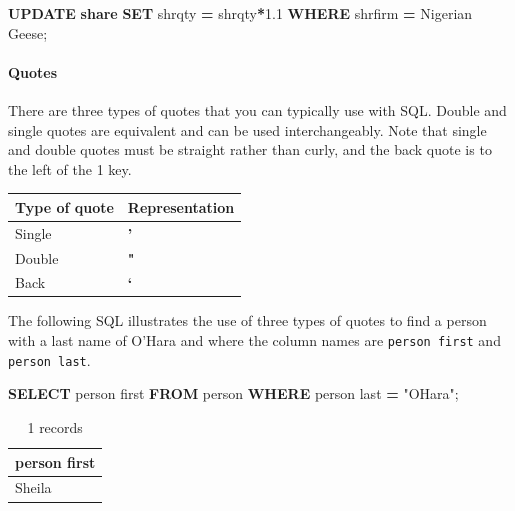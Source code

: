 \documentclass[
]{article}
\newenvironment{Shaded}{\begin{snugshade}}{\end{snugshade}}
\newcommand{\FloatTok}[1]{\textcolor[rgb]{0.00,0.00,0.81}{#1}}
\newcommand{\KeywordTok}[1]{\textcolor[rgb]{0.13,0.29,0.53}{\textbf{#1}}}
\newcommand{\NormalTok}[1]{#1}
\newcommand{\OperatorTok}[1]{\textcolor[rgb]{0.81,0.36,0.00}{\textbf{#1}}}
\newcommand{\OtherTok}[1]{\textcolor[rgb]{0.56,0.35,0.01}{#1}}
\newcommand{\StringTok}[1]{\textcolor[rgb]{0.31,0.60,0.02}{#1}}
\begin{document}
\begin{Shaded}
\begin{Highlighting}[]
\KeywordTok{UPDATE} \KeywordTok{share} \KeywordTok{SET}\NormalTok{ shrqty }\OperatorTok{=}\NormalTok{ shrqty}\OperatorTok{*}\FloatTok{1.1} \KeywordTok{WHERE}\NormalTok{ shrfirm }\OperatorTok{=} \StringTok{\textquotesingle{}Nigerian Geese\textquotesingle{}}\NormalTok{;}
\end{Highlighting}
\end{Shaded}

\hypertarget{quotes}{%
\paragraph*{Quotes}\label{quotes}}

There are three types of quotes that you can typically use with SQL. Double and single quotes are equivalent and can be used interchangeably. Note that single and double quotes must be straight rather than curly, and the back quote is to the left of the 1 key.

\begin{longtable}[]{@{}ll@{}}
\toprule
Type of quote & Representation \\
\midrule
\endhead
Single & \textbf{'} \\
Double & \textbf{"} \\
Back & \textbf{`} \\
\bottomrule
\end{longtable}

The following SQL illustrates the use of three types of quotes to find a person with a last name of O'Hara and where the column names are \texttt{person\ first} and \texttt{person\ last}.

\begin{Shaded}
\begin{Highlighting}[]
\KeywordTok{SELECT}\NormalTok{ \textasciigrave{}person first\textasciigrave{} }\KeywordTok{FROM}\NormalTok{ person }\KeywordTok{WHERE}\NormalTok{ \textasciigrave{}person last\textasciigrave{} }\OperatorTok{=} \OtherTok{"O\textquotesingle{}Hara"}\NormalTok{;}
\end{Highlighting}
\end{Shaded}

\begin{table}

\caption{\label{tab:unnamed-chunk-37}1 records}
\centering
\begin{tabular}[t]{l}
\hline
person first\\
\hline
Sheila\\
\hline
\end{tabular}
\end{table}
\end{document}
